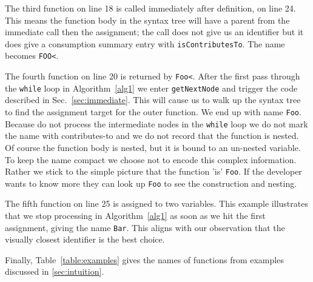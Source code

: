 \documentclass[10pt, preprint]{sigplanconf}
\begin{document}
The third function on line 18 is called immediately after definition, on line 24. This means the function body in the syntax tree will have a parent from the immediate call then the assignment; the call does not give us an identifier but it does give a consumption summary entry with \verb|isContributesTo|. The name becomes \verb|FOO<|.

The fourth function on line 20 is returned by \verb|Foo<|. After the first pass through the \verb|while| loop in Algorithm~\ref{alg1} we enter \verb|getNextNode| and trigger the code described in Sec.~\ref{sec:immediate}.  This will cause us to walk up the syntax tree to find the assignment target for the outer function. We end up with name \verb|Foo|. Because do not process the intermediate nodes in the \verb|while| loop we do not mark the name with contributes-to and we do not record that the function is nested. Of course the function body is nested, but it is bound to an un-nested variable. To keep the name compact we choose not to encode this complex information. Rather we stick to the simple picture that the function 'is' \verb|Foo|. If the developer wants to know more they can look up \verb|Foo| to see the construction and nesting.

The fifth function on line 25 is assigned to two variables. This example illustrates that we stop processing in Algorithm~\ref{alg1} as soon as we hit the first assignment, giving the name \verb|Bar|. This aligns with our observation that the visually closest identifier is the best choice.


Finally, Table~\ref{table:examples} gives the names of functions from examples discussed in \ref{sec:intuition}.
\end{document}
